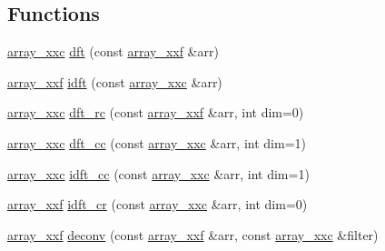 \subsection*{Functions}
\begin{DoxyCompactItemize}
\item 
\hyperlink{namespace_wire_cell_1_1_array_a4688507545975422d74b9ba78530956a}{array\+\_\+xxc} \hyperlink{namespace_wire_cell_1_1_array_aa6783f65a9e3b61db246eee7352fa6ee}{dft} (const \hyperlink{namespace_wire_cell_1_1_array_ab565fef5e33632bb02f0ed4be803020c}{array\+\_\+xxf} \&arr)
\item 
\hyperlink{namespace_wire_cell_1_1_array_ab565fef5e33632bb02f0ed4be803020c}{array\+\_\+xxf} \hyperlink{namespace_wire_cell_1_1_array_a7c00f9a4791a2e3ced35753de37a5403}{idft} (const \hyperlink{namespace_wire_cell_1_1_array_a4688507545975422d74b9ba78530956a}{array\+\_\+xxc} \&arr)
\item 
\hyperlink{namespace_wire_cell_1_1_array_a4688507545975422d74b9ba78530956a}{array\+\_\+xxc} \hyperlink{namespace_wire_cell_1_1_array_aa18a99e94f8ba5fdc974ddfdc5778c97}{dft\+\_\+rc} (const \hyperlink{namespace_wire_cell_1_1_array_ab565fef5e33632bb02f0ed4be803020c}{array\+\_\+xxf} \&arr, int dim=0)
\item 
\hyperlink{namespace_wire_cell_1_1_array_a4688507545975422d74b9ba78530956a}{array\+\_\+xxc} \hyperlink{namespace_wire_cell_1_1_array_a312b7bcf55424009be17c8fd731e85f1}{dft\+\_\+cc} (const \hyperlink{namespace_wire_cell_1_1_array_a4688507545975422d74b9ba78530956a}{array\+\_\+xxc} \&arr, int dim=1)
\item 
\hyperlink{namespace_wire_cell_1_1_array_a4688507545975422d74b9ba78530956a}{array\+\_\+xxc} \hyperlink{namespace_wire_cell_1_1_array_a9d111d786752105dff7dff62704ca7d2}{idft\+\_\+cc} (const \hyperlink{namespace_wire_cell_1_1_array_a4688507545975422d74b9ba78530956a}{array\+\_\+xxc} \&arr, int dim=1)
\item 
\hyperlink{namespace_wire_cell_1_1_array_ab565fef5e33632bb02f0ed4be803020c}{array\+\_\+xxf} \hyperlink{namespace_wire_cell_1_1_array_aff0d07e015ea44d76736b57baa5d3693}{idft\+\_\+cr} (const \hyperlink{namespace_wire_cell_1_1_array_a4688507545975422d74b9ba78530956a}{array\+\_\+xxc} \&arr, int dim=0)
\item 
\hyperlink{namespace_wire_cell_1_1_array_ab565fef5e33632bb02f0ed4be803020c}{array\+\_\+xxf} \hyperlink{namespace_wire_cell_1_1_array_ae1c856168b5f280c3a5dfda8292124b4}{deconv} (const \hyperlink{namespace_wire_cell_1_1_array_ab565fef5e33632bb02f0ed4be803020c}{array\+\_\+xxf} \&arr, const \hyperlink{namespace_wire_cell_1_1_array_a4688507545975422d74b9ba78530956a}{array\+\_\+xxc} \&filter)
\end{DoxyCompactItemize}


